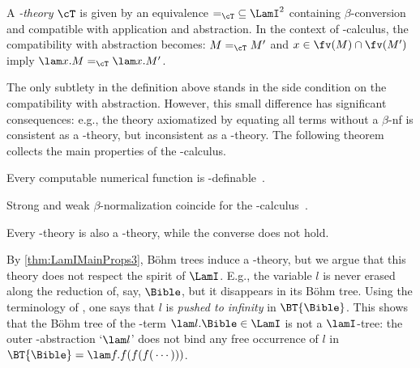\begin{definition}
A \emph{\lamI-theory} $\cT$ is given by an equivalence $\mathord{=_\cT} \subseteq \LamI^2$ containing $\beta$-conversion and compatible with application and abstraction. 
In the context of \lamI-calculus, 
the compatibility with abstraction becomes: 
$M =_\cT M'$ and $x\in\fv(M)\cap\fv(M')$ 
imply $\lam x.M =_\cT \lam x.M'$.
\end{definition}
The only subtlety in the definition above stands in the side condition on the compatibility with abstraction.
However, this small difference has significant consequences: e.g., the theory axiomatized by equating all terms without a $\beta$-nf is consistent as a \lamI-theory, but inconsistent as a \lam-theory.
The following theorem collects the main properties of the \lamI-calculus.
\begin{theorem}\label{thm:LamIMainProps}\mbox{}
\bsub
\item\label{thm:LamIMainProps1} 
	Every computable numerical function is \lamI-definable~\cite[Thm.~9.2.16]{Bare}.
\item\label{thm:LamIMainProps2} 
	Strong and weak $\beta$-normalization coincide for the \lamI-calculus~\cite[Thm.~11.3.4]{Bare}.
\item\label{thm:LamIMainProps3} 
	Every \lam-theory is also a \lamI-theory, while the converse does not hold. 
\esub
\end{theorem}


By \eqref{thm:LamIMainProps3}, Böhm trees induce a \lamI-theory, but we argue that this theory does not respect the spirit of $\LamI$. 
E.g., the variable $l$ is never erased along the reduction of, say, $\Bible$, but it disappears in its B\"ohm tree. Using the terminology of \cite{Bare}, one says that $l$ is \emph{pushed to infinity} in $\BT{\Bible}$.
This shows that the Böhm tree of the \lamI-term $\lam l.\Bible\in\LamI$ is not a $\lamI$-tree: the outer \lam-abstraction `$\lam l$' does not bind any free occurrence of $l$ in $\BT{\Bible} = \lam f.f(f(f(\,\cdots)))$.
